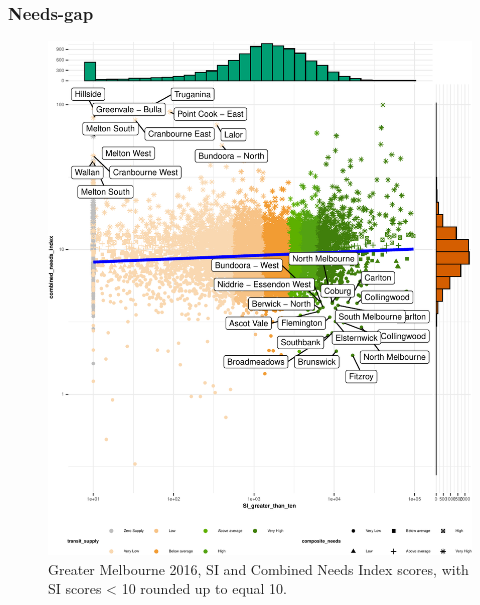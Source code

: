 \documentclass[preprint, 3p,
authoryear]{elsarticle} %
\begin{document}
\subsubsection{Needs-gap}\label{needs-gap}

\begin{figure}
\centering
\includegraphics{Leveraging_GTFS_to_assess_transit_supply_Transport_Geography_files/figure-latex/Greater_Melbourne_2016_needs_gap_scatterplot_figure-1.pdf}
\caption{Greater Melbourne 2016, SI and Combined Needs Index scores,
with SI scores \textless{} 10 rounded up to equal 10.}
\end{figure}
\end{document}
